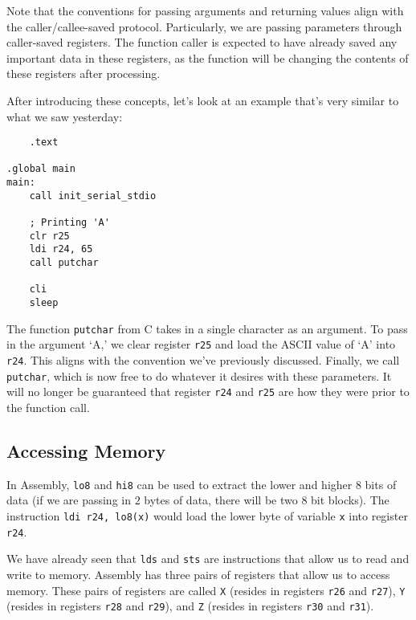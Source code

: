 Note that the conventions for passing arguments and returning values align with the caller/callee-saved protocol. Particularly, we are passing parameters through caller-saved registers. The function caller is expected to have already saved any important data in these registers, as the function will be changing the contents of these registers after processing.


After introducing these concepts, let's look at an example that's very similar to what we saw yesterday:


\lstset{
caption=Assembly: Arguments and Return Values
}
\begin{lstlisting}
    .text
    
.global main
main:
    call init_serial_stdio
    
    ; Printing 'A'
    clr r25
    ldi r24, 65
    call putchar
    
    cli
    sleep
\end{lstlisting}


The function \verb!putchar! from C takes in a single character as an argument. To pass in the argument `A,' we clear register \verb!r25! and load the ASCII value of `A' into \verb!r24!. This aligns with the convention we've previously discussed. Finally, we call \verb!putchar!, which is now free to do whatever it desires with these parameters. It will no longer be guaranteed that register \verb!r24! and \verb!r25! are how they were prior to the function call.



\subsection{Accessing Memory}

In Assembly, \verb!lo8! and \verb!hi8! can be used to extract the lower and higher $8$ bits of data (if we are passing in $2$ bytes of data, there will be two $8$ bit blocks). The instruction \verb!ldi r24, lo8(x)! would load the lower byte of variable \verb!x! into register \verb!r24!. 



We have already seen that \verb!lds! and \verb!sts! are instructions that allow us to read and write to memory. Assembly has three pairs of registers that allow us to access memory. These pairs of registers are called \verb!X! (resides in registers \verb!r26! and \verb!r27!), \verb!Y! (resides in registers \verb!r28! and \verb!r29!), and \verb!Z! (resides in registers \verb!r30! and \verb!r31!). 


